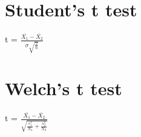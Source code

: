 \documentclass{article}
\begin{document}
\section{Student's t test}
	t = $\frac	{\bar{X_1}-\bar{X_2}}
				{\sigma\sqrt{\frac	{2}
									{n}}}
		$\\
	
\section{Welch's t test}
	t = $\frac	{\bar{X_1}-\bar{X_2}}
				{\sqrt{	\frac{s^{2}_{1}}
						{N_1} +
						\frac{s^{2}_{2}}
						{N_2}}
				}
		$\\

\end{document}
